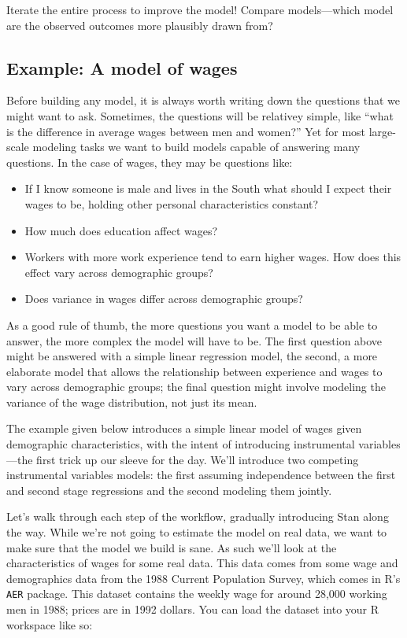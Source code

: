 \documentclass[]{book}
\providecommand{\tightlist}{%
  \setlength{\itemsep}{0pt}\setlength{\parskip}{0pt}}
\begin{document}
Iterate the entire process to improve the model! Compare models---which
model are the observed outcomes more plausibly drawn from?

\subsection{Example: A model of wages}\label{example-a-model-of-wages}

Before building any model, it is always worth writing down the questions
that we might want to ask. Sometimes, the questions will be relativey
simple, like ``what is the difference in average wages between men and
women?'' Yet for most large-scale modeling tasks we want to build models
capable of answering many questions. In the case of wages, they may be
questions like:

\begin{itemize}
\tightlist
\item
  If I know someone is male and lives in the South what should I expect
  their wages to be, holding other personal characteristics constant?
\item
  How much does education affect wages?
\item
  Workers with more work experience tend to earn higher wages. How does
  this effect vary across demographic groups?
\item
  Does variance in wages differ across demographic groups?
\end{itemize}

As a good rule of thumb, the more questions you want a model to be able
to answer, the more complex the model will have to be. The first
question above might be answered with a simple linear regression model,
the second, a more elaborate model that allows the relationship between
experience and wages to vary across demographic groups; the final
question might involve modeling the variance of the wage distribution,
not just its mean.

The example given below introduces a simple linear model of wages given
demographic characteristics, with the intent of introducing instrumental
variables---the first trick up our sleeve for the day. We'll introduce
two competing instrumental variables models: the first assuming
independence between the first and second stage regressions and the
second modeling them jointly.

Let's walk through each step of the workflow, gradually introducing Stan
along the way. While we're not going to estimate the model on real data,
we want to make sure that the model we build is sane. As such we'll look
at the characteristics of wages for some real data. This data comes from
some wage and demographics data from the 1988 Current Population Survey,
which comes in R's \texttt{AER} package. This dataset contains the
weekly wage for around 28,000 working men in 1988; prices are in 1992
dollars. You can load the dataset into your R workspace like so:
\end{document}
